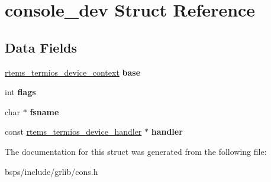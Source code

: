 \hypertarget{structconsole__dev}{}\section{console\+\_\+dev Struct Reference}
\label{structconsole__dev}
\subsection*{Data Fields}
\begin{DoxyCompactItemize}
\item 
\mbox{\label{structconsole__dev_aa1e640ba9f889e7658c7629539ef0531}} 
\mbox{\hyperlink{structrtems__termios__device__context}{rtems\+\_\+termios\+\_\+device\+\_\+context}} {\bfseries base}
\item 
\mbox{\label{structconsole__dev_acae94b6196d443869b2f1dea54a6a4ab}} 
int {\bfseries flags}
\item 
\mbox{\label{structconsole__dev_aca101f827241e94640c967be70644fb6}} 
char $\ast$ {\bfseries fsname}
\item 
\mbox{\label{structconsole__dev_a7caa77dc7cad7805985e63cd56fafcdd}} 
const \mbox{\hyperlink{structrtems__termios__device__handler}{rtems\+\_\+termios\+\_\+device\+\_\+handler}} $\ast$ {\bfseries handler}
\end{DoxyCompactItemize}


The documentation for this struct was generated from the following file\+:\begin{DoxyCompactItemize}
\item 
bsps/include/grlib/cons.\+h\end{DoxyCompactItemize}
